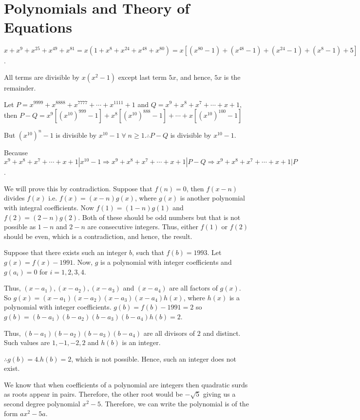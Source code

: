 \chapter{Polynomials and Theory of Equations}
\startitemize[n, 1*broad]
\item $x + x^9 + x^{25} + x^{49} + x^{81} = x(1 + x^8 + x^{24} + x^{48} + x^{80}) = x[(x^{80} - 1) + (x^{48}
  - 1) + (x^{24 } - 1) + (x^{8} - 1) + 5]$.

  All terms are divisible by $x(x^2 - 1)$ except last term $5x$, and hence, $5x$ is the remainder.
\item Let $P = x^{9999} + x^{8888} + x^{7777} + \cdots + x^{1111} + 1$ and $Q = x^9 + x^8 + x^7 + \cdots + x
  + 1$, then $P - Q = x^9[(x^{10})^{999} - 1] + x^8[(x^{10})^{888} - 1] + \cdots + x[(x^{10})^{100} - 1]$

  But $(x^{10})^n - 1$ is divisible by $x^{10} - 1\;\forall\;n\geq 1. \therefore P - Q$ is divisible by
  $x^{10} - 1$.

  Because $x^9 + x^8 + x^7 + \cdots + x + 1|x^{10} - 1\Rightarrow x^9 + x^8 + x^7 + \cdots + x + 1|P - Q
  \Rightarrow x^9 + x^8 + x^7 + \cdots + x + 1|P$.
\item We will prove this by contradiction. Suppose that $f(n) = 0$, then $f(x - n)$ divides $f(x)$
  i.e. $f(x) = (x - n)g(x)$, where $g(x)$ is another polynomial with integral coefficients. Now $f(1) = (1 -
  n)g(1)$ and $f(2) = (2 - n)g(2)$. Both of these should be odd numbers but that is not possible as $1 - n$
  and $2 - n$ are consecutive integers. Thus, either $f(1)$ or $f(2)$ should be even, which is a
  contradiction, and hence, the result.
\item Suppose that there exists such an integer $b$, such that $f(b) = 1993$. Let $g(x) = f(x) - 1991$. Now,
  $g$ is a polynomial with integer coefficients and $g(a_i) = 0$ for $i = 1, 2, 3, 4$.

  Thus, $(x - a_1), (x - a_2), (x - a_3)$ and $(x - a_4)$ are all factors of $g(x)$. So $g(x) = (x - a_1)(x
  - a_2)(x - a_3)(x - a_4)h(x)$, where $h(x)$ is a polynomial with integer coefficients. $g(b) = f(b) - 1991
  = 2$ so $g(b) = (b - a_1)(b - a_2)(b - a_3)(b - a_4)h(b) = 2$.

  Thus, $(b - a_1)(b - a_2)(b - a_3)(b - a_4)$ are all divisors of $2$ and distinct. Such values are $1, -1,
  -2, 2$ and $h(b)$ is an integer.

  $\therefore g(b) = 4.h(b) = 2$, which is not possible. Hence, such an integer does not exist.
\item We know that when coefficients of a polynomial are integers then quadratic surds as roots appear in
  pairs. Therefore, the other root would be $-\sqrt{5}$ giving us a second degree polynomial $x^2 -
  5$. Therefore, we can write the polynomial is of the form $ax^2 - 5a$.


